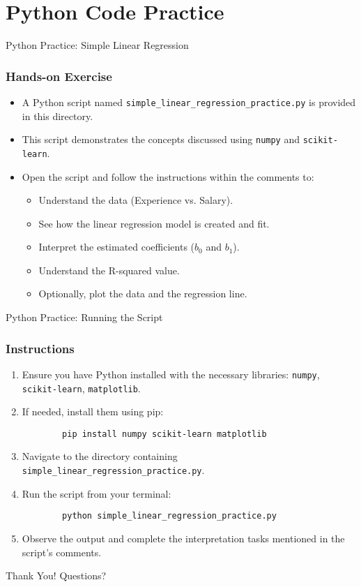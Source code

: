 \documentclass[aspectratio=169]{beamer}
\begin{document}
\section{Python Code Practice}

\begin{frame}{Python Practice: Simple Linear Regression}
    \frametitle{Hands-on Exercise}
    \begin{itemize}
        \item A Python script named \texttt{simple\_linear\_regression\_practice.py} is provided in this directory.
        \item This script demonstrates the concepts discussed using \texttt{numpy} and \texttt{scikit-learn}.
        \item Open the script and follow the instructions within the comments to:
        \begin{itemize}
            \item Understand the data (Experience vs. Salary).
            \item See how the linear regression model is created and fit.
            \item Interpret the estimated coefficients ($b_0$ and $b_1$).
            \item Understand the R-squared value.
            \item Optionally, plot the data and the regression line.
        \end{itemize}
    \end{itemize}
\end{frame}

\begin{frame}{Python Practice: Running the Script}
    \frametitle{Instructions}
    \begin{enumerate}
        \item Ensure you have Python installed with the necessary libraries: \texttt{numpy}, \texttt{scikit-learn}, \texttt{matplotlib}.
        \item If needed, install them using pip:
        \begin{verbatim}
        pip install numpy scikit-learn matplotlib
        \end{verbatim}
        \item Navigate to the directory containing \texttt{simple\_linear\_regression\_practice.py}.
        \item Run the script from your terminal:
        \begin{verbatim}
        python simple_linear_regression_practice.py
        \end{verbatim}
        \item Observe the output and complete the interpretation tasks mentioned in the script's comments.
    \end{enumerate}
\end{frame}

\begin{frame}
  \centering
  \Huge Thank You!
  \vspace{1cm}
  \normalsize Questions?
\end{frame}
\end{document}
